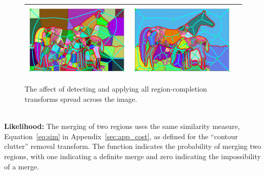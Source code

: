 \begin{figure}[!ht]
\begin{tabular}{|c|c|c|}
\includegraphics[width=0.33\linewidth]{figs/113044_00_type1_atomic_frags.pdf} &
\includegraphics[width=0.33\linewidth]{figs/113044_00_mvf_frags.pdf}\\
\hline

\end{tabular}

\caption{The affect of detecting and applying all region-completion transforms spread across the image.}
\label{fig:real_pre_process}
\end{figure}



\noindent\\
{\bf Likelihood:} The merging of two regions uses the same similarity measure, Equation~\ref{eq:sim} in Appendix~\ref{sec:app_cost}, as defined for the ``contour clutter'' removal transform. The function indicates the probability of merging two regions, with one indicating a definite merge and zero indicating the impossibility of a merge.  %

